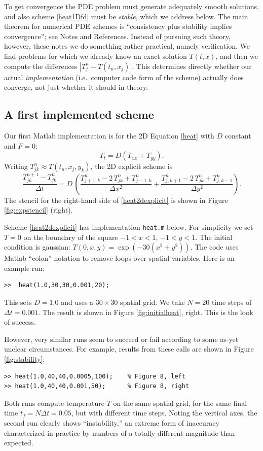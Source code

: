 \documentclass[letterpaper,final,12pt,reqno]{amsart}
\newcommand{\minput}[1]{
\vspace{0.8cm}
\VerbatimInput[frame=single,framesep=3mm,label=\fbox{\normalsize \textsl{\,#1.m\,}},fontfamily=courier,fontsize=\footnotesize]{tmp/#1.slim.m}
\vspace{0.5cm}
}
\begin{document}
To get convergence the PDE problem must generate adequately smooth solutions, and also scheme \eqref{heat1Dfd} must be \emph{stable}, which we address below.  The main theorem for numerical PDE schemes is ``consistency plus stability implies convergence''; see Notes and References.  Instead of pursuing such theory, however, these notes we do something rather practical, namely verification.  We find problems for which we already know an exact solution $T(t,x)$, and then we compute the differences $|T_j^n - T(t_n,x_j)|$.  This determines directly whether our actual \emph{implementation} (i.e.~computer code form of the scheme) actually does converge, not just whether it should in theory.

\subsection*{A first implemented scheme}  Our first Matlab implementation is for the 2D Equation \eqref{heat} with $D$ constant and $F=0$:
\begin{equation}
T_t = D (T_{xx}+T_{yy}).\label{heat2D}
\end{equation}
Writing $T_{jk}^n \approx T(t_n,x_j,y_k)$, the 2D explicit scheme is
\begin{equation}
	\frac{T_{jk}^{n+1} - T_{jk}^n}{\Delta t} = D\,\left(\frac{T_{j+1,k}^n - 2\, T_{jk}^n + T_{j-1,k}^n}{\Delta x^2} + \frac{T_{j,k+1}^n - 2\, T_{jk}^n + T_{j,k-1}^n}{\Delta y^2}\right). \label{heat2dexplicit}
\end{equation}
The stencil for the right-hand side of \eqref{heat2dexplicit} is shown in Figure \ref{fig:expstencil} (right).

Scheme \eqref{heat2dexplicit} has implementation \texttt{heat.m} below.  For simplicity we set $T=0$ on the boundary of the square $-1 < x < 1$, $-1 < y < 1$.  The initial condition is gaussian: $T(0,x,y) = \exp(-30 (x^2+y^2))$.  The code uses Matlab ``colon'' notation to remove loops over spatial variables.  Here is an example run:
\begin{Verbatim}
>>  heat(1.0,30,30,0.001,20);
\end{Verbatim}
This sets $D=1.0$ and uses a $30\times 30$ spatial grid.  We take $N=20$ time steps of $\Delta t = 0.001$.  The result is shown in Figure \ref{fig:initialheat}, right.  This is the look of success.

\minput{heat}

However, very similar runs seem to succeed or fail according to some as-yet unclear circumstances.  For example, results from these calls are shown in Figure \ref{fig:stability}:
\begin{Verbatim}
>> heat(1.0,40,40,0.0005,100);    % Figure 8, left
>> heat(1.0,40,40,0.001,50);      % Figure 8, right
\end{Verbatim}
Both runs compute temperature $T$ on the same spatial grid, for the same final time $t_f = N \Delta t = 0.05$, but with different time steps.  Noting the vertical axes, the second run clearly shows ``instability,'' an extreme form of inaccuracy characterized in practice by numbers of a totally different magnitude than expected.
\end{document}
